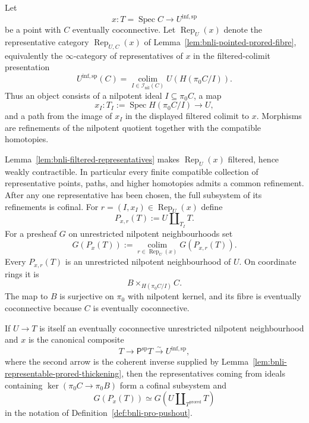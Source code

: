 \begin{definition}
\label{def:bnli-pointed-pro-pushout}
Let
\[
    x:T=\operatorname{Spec}C
    \longrightarrow
    U^{\mathrm{inf,sp}}
\]
be a point with $C$ eventually coconnective.  Let
$\operatorname{Rep}_{U}(x)$ denote the representative category
$\operatorname{Rep}_{U,C}(x)$ of
Lemma~\ref{lem:bnli-pointed-prored-fibre}, equivalently the $\infty$-category
of representatives of $x$ in the filtered-colimit presentation
\[
    U^{\mathrm{inf,sp}}(C)
    =
    \operatorname*{colim}_{I\in\mathcal I_{\mathrm{nil}}(C)}
    U\!\left(H(\pi_0C/I)\right).
\]
Thus an object consists of a nilpotent ideal
$I\subseteq\pi_0C$, a map
\[
    x_I:
    T_I:=\operatorname{Spec}H(\pi_0C/I)
    \longrightarrow U,
\]
and a path from the image of $x_I$ in the displayed filtered colimit to
$x$.  Morphisms are refinements of the nilpotent quotient together with the
compatible homotopies.

Lemma~\ref{lem:bnli-filtered-representatives} makes
$\operatorname{Rep}_{U}(x)$ filtered, hence weakly contractible.  In
particular every finite compatible collection of representative points,
paths, and higher homotopies admits a common refinement.  After any one
representative has been chosen, the full subsystem of its refinements is
cofinal.  For
$r=(I,x_I)\in\operatorname{Rep}_{U}(x)$ define
\[
\boxed{
    P_{x,r}(T)
    :=
    U\amalg_{T_I}T.}
\]
For a presheaf $G$ on unrestricted nilpotent neighbourhoods set
\[
\boxed{
    G(P_x(T))
    :=
    \operatorname*{colim}_{r\in\operatorname{Rep}_{U}(x)}
    G(P_{x,r}(T)).}
\]
Every $P_{x,r}(T)$ is an unrestricted nilpotent neighbourhood of $U$.  On
coordinate rings it is
\[
    B\times_{H(\pi_0C/I)}C.
\]
The map to $B$ is surjective on $\pi_0$ with nilpotent kernel, and its fibre
is eventually coconnective because $C$ is eventually coconnective.

If $U\to T$ is itself an eventually coconnective unrestricted nilpotent
neighbourhood and $x$ is the canonical composite
\[
    T\longrightarrow\mathsf P^{\mathrm{sp}}T
    \xrightarrow{\sim}U^{\mathrm{inf,sp}},
\]
where the second arrow is the coherent inverse supplied by
Lemma~\ref{lem:bnli-representable-prored-thickening}, then the representatives coming from ideals containing
$\ker(\pi_0C\to\pi_0B)$ form a cofinal subsystem and
\[
    G(P_x(T))
    \simeq
    G(U\amalg_{T^{\mathrm{prored}}}T)
\]
in the notation of Definition~\ref{def:bnli-pro-pushout}.
\end{definition}

